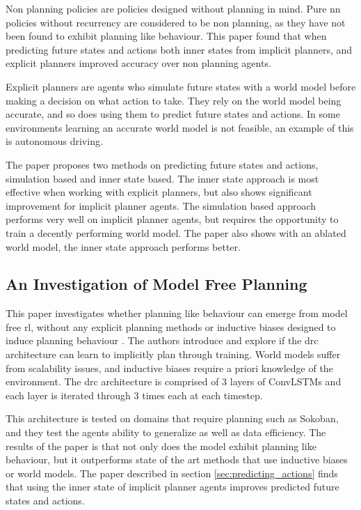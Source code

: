 \documentclass[UKenglish]{uiomasterthesis}
\begin{document}
Non planning policies are policies designed without planning in mind. Pure \ac{nn} policies without recurrency are considered to be non planning, as they have not been found to exhibit planning like behaviour. This paper found that when predicting future states and actions both inner states from implicit planners, and explicit planners improved accuracy over non planning agents.

Explicit planners are agents who simulate future states with a world model before making a decision on what action to take. They rely on the world model being accurate, and so does using them to predict future states and actions. In some environments learning an accurate world model is not feasible, an example of this is autonomous driving.

The paper proposes two methods on predicting future states and actions, simulation based and inner state based. The inner state approach is most effective when working with explicit planners, but also shows significant improvement for implicit planner agents. The simulation based approach performs very well on implicit planner agents, but requires the opportunity to train a decently performing world model. The paper also shows with an ablated world model, the inner state approach performs better.

\subsection{An Investigation of Model Free Planning}
\label{sec:impl_planning}
This paper investigates whether planning like behaviour can emerge from model free \ac{rl}, without any explicit planning methods or inductive biases designed to induce planning behaviour \cite{guez2019investigationmodelfreeplanning}. The authors introduce and explore if the \ac{drc} architecture can learn to implicitly plan through training. World models suffer from scalability issues, and inductive biases require a priori knowledge of the environment. The \ac{drc} architecture is comprised of $3$ layers of ConvLSTMs and each layer is iterated through $3$ times each at each timestep.

This architecture is tested on domains that require planning such as Sokoban, and they test the agents ability to generalize as well as data efficiency. The results of the paper is that not only does the model exhibit planning like behaviour, but it outperforms state of the art methods that use inductive biases or world models. The paper described in section \ref{sec:predicting_actions} finds that using the inner state of implicit planner agents improves predicted future states and actions.
\end{document}
